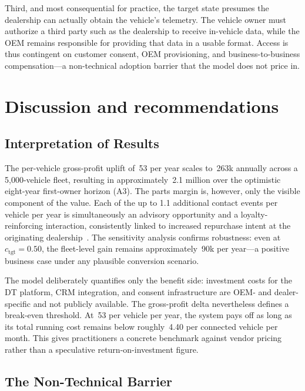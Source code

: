 \documentclass[conference,a4paper]{IEEEtran}
\newcommand{\eur}{\ifmmode\text{\texteuro}\else\texteuro\fi}
\newcommand{\cSoll}{c_{\mathrm{tgt}}}
\begin{document}
Third, and most consequential for practice, the target state presumes the
dealership can actually obtain the vehicle's telemetry. The vehicle owner must authorize a third party such as the dealership to receive
in-vehicle data, while the OEM remains responsible for providing that data in
a usable format. Access is thus contingent on customer consent, OEM provisioning, and
business-to-business compensation---a non-technical adoption barrier that
the model does not price in.
\FloatBarrier
\section{Discussion and recommendations}

\subsection{Interpretation of Results}

The per-vehicle gross-profit uplift of \eur\,53 per year scales to \eur\,263k
annually across a 5{,}000-vehicle fleet, resulting in approximately
\eur\,2.1 million over the optimistic eight-year first-owner horizon (A3). The parts
margin is, however, only the visible component of the value. Each of the
up to 1.1 additional contact events per vehicle per year is simultaneously an
advisory opportunity and a loyalty-reinforcing interaction, consistently
linked to increased repurchase intent at the originating dealership~\cite{challagalla_proactive_2009,gonzalez_service_2015}.
The sensitivity analysis confirms robustness: even at $\cSoll = 0.50$, the
fleet-level gain remains approximately \eur\,90k per year---a positive
business case under any plausible conversion scenario.

The model deliberately quantifies only the benefit side: investment costs for
the DT platform, CRM integration, and consent infrastructure are OEM- and
dealer-specific and not publicly available. The gross-profit delta
nevertheless defines a break-even threshold. At \eur\,53 per vehicle per
year, the system pays off as long as its total running cost remains below
roughly \eur\,4.40 per connected vehicle per month. This gives practitioners
a concrete benchmark against vendor pricing rather than a speculative
return-on-investment figure.

\subsection{The Non-Technical Barrier}
\end{document}
